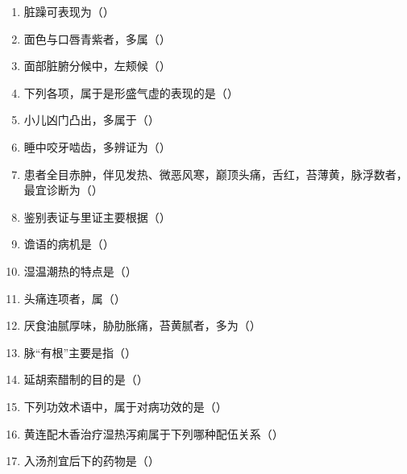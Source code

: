 \documentclass[a4paper,11pt]{ctexart}
\begin{document}
\begin{enumerate}
      \item 脏躁可表现为（\quad）
      \item 面色与口唇青紫者，多属（\quad）
      \item 面部脏腑分候中，左颊候（\quad）
      \item 下列各项，属于是形盛气虚的表现的是（\quad）
      \item 小儿凶门凸出，多属于（\quad）
      \item 睡中咬牙啮齿，多辨证为（\quad）
      \item 患者全目赤肿，伴见发热、微恶风寒，巅顶头痛，舌红，苔薄黄，脉浮数者，最宜诊断为（\quad）
      \item 鉴别表证与里证主要根据（\quad）
      \item 谵语的病机是（\quad）
      \item 湿温潮热的特点是（\quad）
      \item 头痛连项者，属（\quad）
      \item 厌食油腻厚味，胁肋胀痛，苔黄腻者，多为（\quad）
      \item 脉“有根”主要是指（\quad）
      \item 延胡索醋制的目的是（\quad）
      \item 下列功效术语中，属于对病功效的是（\quad）
      \item 黄连配木香治疗湿热泻痢属于下列哪种配伍关系（\quad）
      \item 入汤剂宜后下的药物是（\quad）

\end{enumerate}
\end{document}
